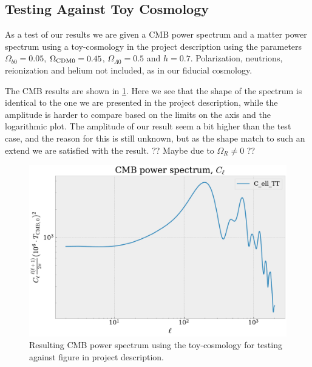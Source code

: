 \documentclass[10pt,a4paper]{article}
\begin{document}
\clearpage
\begin{appendices}
  \appendix
  \section{Testing Against Toy Cosmology}
  \label{Asec:Testing toy}
  As a test of our results we are given a CMB power spectrum and a matter power spectrum using a toy-cosmology in the project description using the parameters $\Omega_{b0} = 0.05$, $\Omega_{\rm CDM 0} = 0.45$, $\Omega_{\Lambda 0} = 0.5$ and $h=0.7$. Polarization, neutrions, reionization and helium not included, as in our fiducial cosmology.
  
  The CMB results are shown in \cref{fig: Cell toy}. Here we see that the shape of the spectrum is identical to the one we are presented in the project description, while the amplitude is harder to compare based on the limits on the axis and the logarithmic plot. The amplitude of our result seem a bit higher than the test case, and the reason for this is still unknown, but as the shape match to such an extend we are satisfied with the result.
  ?? Maybe due to $\Omega_R \neq 0$ ?? 
  \begin{figure}[ht!]
    \centering
    \includegraphics[scale=0.5]{../figs/Cells_toy.pdf}
    \caption{Resulting CMB power spectrum using the toy-cosmology for testing against figure in project description.}
    \label{fig: Cell toy}
  \end{figure}


\end{appendices}
\end{document}
